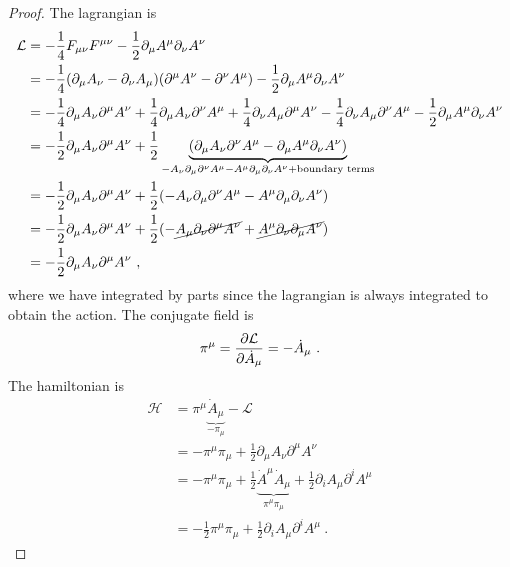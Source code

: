     \begin{proof}
        The lagrangian is 
        \begin{equation*}
        \begin{aligned}
            \mathcal L & = - \frac{1}{4} F_{\mu\nu} F^{\mu\nu} - \frac{1}{2} \partial_\mu A^\mu \partial_\nu A^\nu \\ & = - \frac{1}{4} (\partial_\mu A_\nu - \partial_\nu A_\mu) (\partial^\mu A^\nu - \partial^\nu A^\mu) - \frac{1}{2} \partial_\mu A^\mu \partial_\nu A^\nu \\ & = - \frac{1}{4} \partial_\mu A_\nu \partial^\mu A^\nu + \frac{1}{4} \partial_\mu A_\nu \partial^\nu A^\mu + \frac{1}{4} \partial_\nu A_\mu \partial^\mu A^\nu - \frac{1}{4} \partial_\nu A_\mu \partial^\nu A^\mu - \frac{1}{2} \partial_\mu A^\mu \partial_\nu A^\nu \\ & = - \frac{1}{2} \partial_\mu A_\nu \partial^\mu A^\nu + \frac{1}{2} \underbrace{(\partial_\mu A_\nu \partial^\nu A^\mu - \partial_\mu A^\mu \partial_\nu A^\nu) }_{ - A_\nu  \partial_\mu \partial^\nu A^\mu - A^\mu \partial_\mu \partial_\nu A^\nu + \textnormal{boundary terms}} \\ & = - \frac{1}{2} \partial_\mu A_\nu \partial^\mu A^\nu + \frac{1}{2} (- A_\nu  \partial_\mu \partial^\nu A^\mu - A^\mu \partial_\mu \partial_\nu A^\nu) \\ & = - \frac{1}{2} \partial_\mu A_\nu \partial^\mu A^\nu + \frac{1}{2} (- \cancel{A_\mu  \partial_\nu \partial^\mu A^\nu} + \cancel{A^\mu \partial_\nu \partial_\mu A^\nu}) \\ & = - \frac{1}{2} \partial_\mu A_\nu \partial^\mu A^\nu ~,
        \end{aligned}
        \end{equation*}
        where we have integrated by parts since the lagrangian is always integrated to obtain the action. The conjugate field is 
        \begin{equation*}
            \pi^\mu = \frac{\partial\mathcal L}{\partial\dot A_\mu} = - \dot A_\mu ~.
        \end{equation*}
        The hamiltonian is 
        \begin{equation*}
        \begin{aligned}
            \mathcal H & = \pi^\mu \underbrace{\dot A_\mu}_{- \pi_\mu} - \mathcal L \\ & = - \pi^\mu \pi_\mu + \frac{1}{2} \partial_\mu A_\nu \partial^\mu A^\nu \\ & = - \pi^\mu \pi_\mu + \frac{1}{2} \underbrace{\dot A^\mu \dot A_\mu}_{\pi^\mu \pi_\mu} + \frac{1}{2} \partial_i A_\mu \partial^i A^\mu \\ & = - \frac{1}{2} \pi^\mu \pi_\mu + \frac{1}{2} \partial_i A_\mu \partial^i A^\mu ~.
        \end{aligned}
        \end{equation*}


\end{proof}
